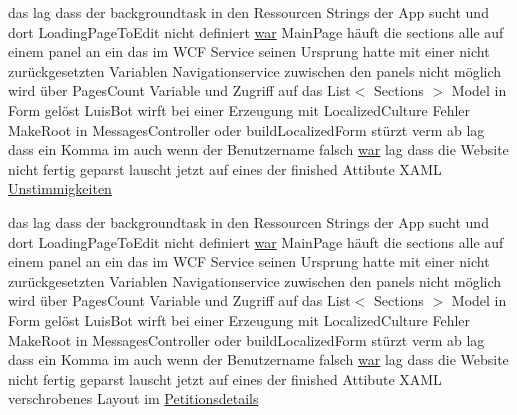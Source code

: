 \begin{DoxyCompactItemize}
\item 
das lag dass der backgroundtask in den Ressourcen Strings der App sucht und dort Loading\+Page\+To\+Edit nicht definiert \mbox{\hyperlink{_r_e_a_d_m_e_8txt_a2a72fc7da943588cba8c302409b22e53}{war}} Main\+Page häuft die sections alle auf einem panel an ein das im W\+CF Service seinen Ursprung hatte mit einer nicht zurückgesetzten Variablen Navigationservice zuwischen den panels nicht möglich wird über Pages\+Count Variable und Zugriff auf das List$<$ Sections $>$ Model in Form gelöst Luis\+Bot wirft bei einer Erzeugung mit Localized\+Culture Fehler Make\+Root in Messages\+Controller oder build\+Localized\+Form stürzt verm ab lag dass ein Komma im auch wenn der Benutzername falsch \mbox{\hyperlink{_r_e_a_d_m_e_8txt_a2a72fc7da943588cba8c302409b22e53}{war}} lag dass die Website nicht fertig geparst lauscht jetzt auf eines der finished Attibute X\+A\+ML \mbox{\hyperlink{_r_e_a_d_m_e_8txt_ac0dcc138103869e0359e06225049e770}{Unstimmigkeiten}}
\item 
das lag dass der backgroundtask in den Ressourcen Strings der App sucht und dort Loading\+Page\+To\+Edit nicht definiert \mbox{\hyperlink{_r_e_a_d_m_e_8txt_a2a72fc7da943588cba8c302409b22e53}{war}} Main\+Page häuft die sections alle auf einem panel an ein das im W\+CF Service seinen Ursprung hatte mit einer nicht zurückgesetzten Variablen Navigationservice zuwischen den panels nicht möglich wird über Pages\+Count Variable und Zugriff auf das List$<$ Sections $>$ Model in Form gelöst Luis\+Bot wirft bei einer Erzeugung mit Localized\+Culture Fehler Make\+Root in Messages\+Controller oder build\+Localized\+Form stürzt verm ab lag dass ein Komma im auch wenn der Benutzername falsch \mbox{\hyperlink{_r_e_a_d_m_e_8txt_a2a72fc7da943588cba8c302409b22e53}{war}} lag dass die Website nicht fertig geparst lauscht jetzt auf eines der finished Attibute X\+A\+ML verschrobenes Layout im \mbox{\hyperlink{_r_e_a_d_m_e_8txt_ab1eb46320c0ab46284b341bc594406ed}{Petitionsdetails}}
\item 

\end{DoxyCompactItemize}
